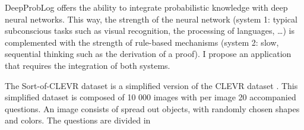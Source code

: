 \documentclass{setup}
\begin{document}
	\maketitle

	DeepProbLog offers the ability to integrate probabilistic knowledge with deep neural networks. This way, the strength of the neural network (system 1: typical subconscious tasks such as visual recognition, the processing of languages, \dots) is complemented with the strength of rule-based mechanisms (system 2: slow, sequential thinking such as the derivation of a proof). I propose an application that requires the integration of both systems.

	The Sort-of-CLEVR dataset is a simplified version of the CLEVR dataset \cite{clevr_dataset}. This simplified dataset is composed of 10 000 images with per image 20 accompanied questions. An image consists of spread out objects, with randomly chosen shapes and colors. The questions are divided in 

	 
	 
	
\end{document}
